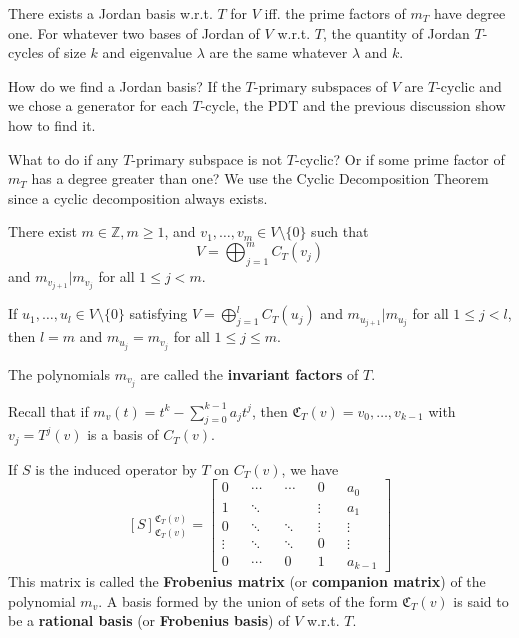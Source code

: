 \begin{theorem}	
	There exists a Jordan basis w.r.t. $T$ for $V$ iff. the prime factors of $m_T$ have degree one. For whatever two bases of Jordan of $V$ w.r.t. $T$, the quantity of Jordan $T$-cycles of size $k$ and eigenvalue $\lambda$ are the same whatever $\lambda$ and $k$.
\end{theorem}

How do we find a Jordan basis? If the $T$-primary subspaces of $V$ are $T$-cyclic and we chose a generator for each $T$-cycle, the PDT and the previous discussion show how to find it.

What to do if any $T$-primary subspace is not $T$-cyclic? Or if some prime factor of $m_T$ has a degree greater than one? We use the Cyclic Decomposition Theorem since a cyclic decomposition always exists.

\begin{theorem}\label{thm:CDT}
	There exist $m \in \mathbb{Z}, m \geq 1$, and $v_1, \ldots, v_m \in V \setminus \{ 0 \}$ such that
	\[
		V = \bigoplus_{j=1}^m C_T(v_j)
	\]
	and $m_{v_{j+1}} | m_{v_j}$ for all $1 \leq j < m$.
	
	If $u_1, \ldots, u_l \in V \setminus \{ 0 \}$ satisfying $V = \bigoplus_{j=1}^l C_T(u_j)$ and $m_{u_{j+1}} | m_{u_j}$ for all $1 \leq j < l$, then $l = m$ and $m_{u_j} = m_{v_j}$ for all $1 \leq j \leq m$.
\end{theorem}

The polynomials $m_{v_j}$ are called the \textbf{invariant factors} of $T$.

Recall that if $m_v(t) = t^k - \sum_{j=0}^{k-1} a_j t^j$, then $\mathfrak{C}_T(v) = v_0, \ldots, v_{k-1}$ with $v_j = T^j(v)$ is a basis of $C_T(v)$.

If $S$ is the induced operator by $T$ on $C_T(v)$, we have
\[
	[S]_{\mathfrak{C}_T(v)}^{\mathfrak{C}_T(v)} = \begin{bmatrix}
		0 		&& \cdots && \cdots && 0		&& a_0 \\
		1 		&& \ddots && 		&& \vdots	&& a_1 \\
		0 		&& \ddots && \ddots && \vdots	&& \vdots \\
		\vdots 	&& \ddots && \ddots && 0		&& \vdots \\
		0 		&& \cdots && 0 		&& 1		&& a_{k-1}
	\end{bmatrix}
\]
This matrix is called the \textbf{Frobenius matrix} (or \textbf{companion matrix}) of the polynomial $m_v$. A basis formed by the union of sets of the form $\mathfrak{C}_T(v)$ is said to be a \textbf{rational basis} (or \textbf{Frobenius basis}) of $V$ w.r.t. $T$.
	
